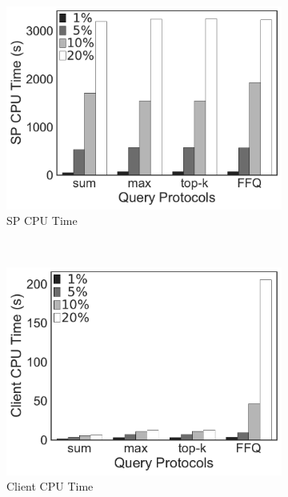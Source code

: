 \begin{figure}[t]
  \centering
  \begin{subfigure}[b]{.31\linewidth}
    \centering
    \includegraphics[width=\linewidth]{exp-figs/aggregate-queries/tpch_sp.pdf}
    \caption{SP CPU Time}
  \end{subfigure}~%
  \begin{subfigure}[b]{.31\linewidth}
    \centering
    \includegraphics[width=\linewidth]{exp-figs/aggregate-queries/tpch_client.pdf}
    \caption{Client CPU Time}
  \end{subfigure}~%
  \begin{subfigure}[b]{.36\linewidth}
    \centering

\end{subfigure}
\end{figure}
